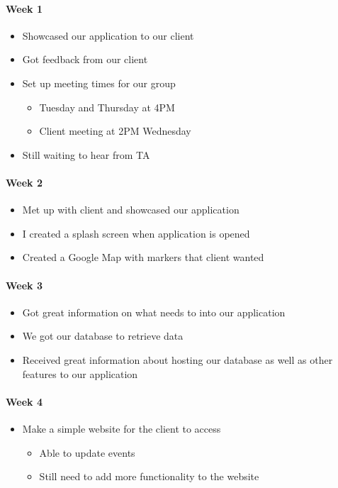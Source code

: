 \documentclass[onecolumn, draftclsnofoot,10pt, compsoc]{IEEEtran}
\begin{document}
      \paragraph{Week 1}
        \begin{itemize}
          \item Showcased our application to our client
          \item Got feedback from our client
          \item Set up meeting times for our group
            \begin{itemize}
              \item Tuesday and Thursday at 4PM
              \item Client meeting at 2PM Wednesday
            \end{itemize}
          \item Still waiting to hear from TA
        \end{itemize}

      \paragraph{Week 2}
        \begin{itemize}
          \item Met up with client and showcased our application
          \item I created a splash screen when application is opened
          \item Created a Google Map with markers that client wanted
        \end{itemize}

      \paragraph{Week 3}
        \begin{itemize}
          \item Got great information on what needs to into our application
          \item We got our database to retrieve data
          \item Received great information about hosting our database as well as other features to our application
        \end{itemize}

      \paragraph{Week 4}
        \begin{itemize}
          \item Make a simple website for the client to access
            \begin{itemize}
              \item Able to update events
              \item Still need to add more functionality to the website
            \end{itemize}
        \end{itemize}
\end{document}

